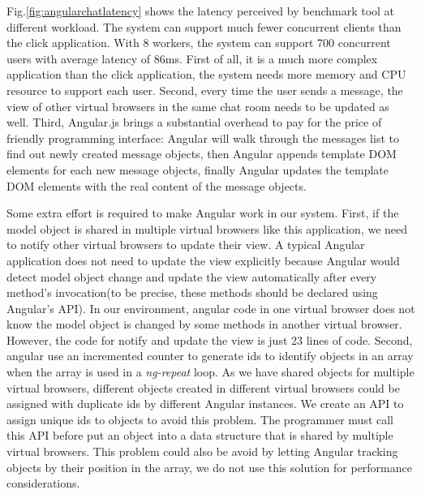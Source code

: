 Fig.\ref{fig:angularchatlatency} shows the latency perceived by benchmark tool
at different workload.
The system can support much fewer concurrent clients than the click application.
With 8 workers, the system can support 700 concurrent users with average latency 
of 86ms.
First of all, it is a much more complex application than the click application,
the system needs more memory and CPU resource to support each user.
Second, every time the user sends a message, the view of other virtual browsers
in the same chat room needs to be updated as well.
Third, Angular.js brings a substantial overhead 
to pay for the price of friendly programming interface: %
Angular will walk through the messages list to find out newly created
message objects,
then Angular appends template DOM elements for each new message objects,
finally Angular updates the template DOM elements with the real content of the 
message objects.

Some extra effort is required to make Angular work in our system.
First, if the model object is shared in multiple virtual browsers like this application,
we need to notify other virtual browsers to update their view.
A typical Angular application does not need to update the view explicitly because
Angular would detect model object change and update the view automatically 
after every method's invocation(to be precise, these methods should be declared using Angular's API).
In our environment, angular code in one virtual browser does not know the model object
is changed by some methods in another virtual browser.
However, the code for notify and update the view is just 23 lines of code.
Second, angular use an incremented counter to generate ids to identify objects in an array when the 
array is used in a \emph{ng-repeat} loop.
As we have shared objects for multiple virtual browsers,
different objects created in different virtual browsers could be assigned with duplicate 
ids by different Angular instances.
We create an API to assign unique ids to objects to avoid this problem.
The programmer must call this API before put an object into a data structure that is shared
by multiple virtual browsers.
This problem could also be avoid by letting Angular tracking objects by their position in the array,
we do not use this solution for performance considerations.


\angularchatlatency{}

